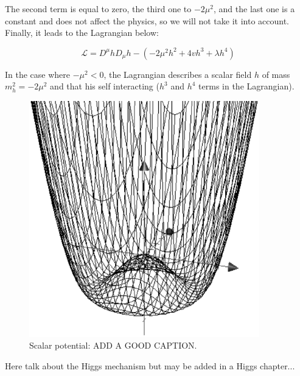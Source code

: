     The second term is equal to zero, the third one to $-2 \mu^2$, and the last one is a constant and does not affect the physics, so we will not take it into account.
    Finally, it leads to the Lagrangian below:

    \begin{equation}
      \mathcal{L} = D^{\mu}hD_{\mu}h - \left( -2\mu^2h^2 +4vh^3 + \lambda h^4 \right) 
    \end{equation}
    
    In the case where $-\mu^2 < 0$, the Lagrangian describes a scalar field $h$ of mass $m_h^2 = -2 \mu^2$ and that his self interacting ($h^3$ and $h^4$ terms in the Lagrangian).

    \begin{figure}[h]
    \centering
      \includegraphics[width = 10cm]{Pictures/SM/mexHat.eps}
    \caption{Scalar potential: ADD A GOOD CAPTION.}
    \label{fig:scalarPotential}
    \end{figure}

    Here talk about the Higgs mechanism but may be added in a Higgs chapter...




